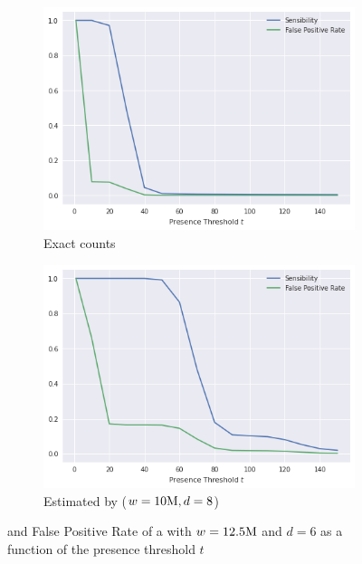 \begin{figure}[htbp]
    \centering
    \begin{subfigure}{.5\textwidth}
        \centering
        \includegraphics[width=\textwidth]{figures/e_coli-threshold_exploration-K31-exact}
        \caption{Exact counts}\label{fig:ecoli-art-dbcm-threshold-exact}
    \end{subfigure}%
    \begin{subfigure}{.5\textwidth}
        \centering
        \includegraphics[width=\textwidth]{figures/e_coli-threshold_exploration-K31-W10000000-D6}
        \caption{Estimated by \dBCM ($w=10\mega, d=8$)}\label{fig:ecoli-art-dbcm-threshold-estimated}
    \end{subfigure}
    \caption{ and False Positive Rate of a \dBCM with $w = 12.5\mega$ and $d = 6$ as a function of the presence threshold $t$}\label{fig:ecoli-art-dbcm-threshold}
\end{figure}

